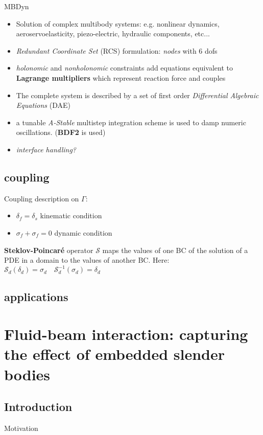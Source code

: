 \documentclass{beamer}
\begin{document}
\begin{frame}{MBDyn}
    \begin{itemize}
        \item Solution of complex multibody systems: e.g. nonlinear dynamics, aeroservoelasticity, piezo-electric, hydraulic components, etc...
        \item \textit{Redundant Coordinate Set} (RCS) formulation: \textit{nodes} with 6 dofs
        \item \textit{holonomic} and \textit{nonholonomic} constraints add equations equivalent to \textbf{Lagrange multipliers} which represent reaction force and couples
        \item The complete system is described by a set of first order \textit{Differential Algebraic Equations} (DAE)
        \item a tunable \textit{A-Stable} multistep integration scheme is used to damp numeric oscillations. (\textbf{BDF2} is used)
        \item \textit{interface handling?}
    \end{itemize}
\end{frame}

\subsection{coupling}

\begin{frame}{Coupling description}
on $\Gamma$:
    \begin{itemize}
        \item $\delta_f = \delta_s$  kinematic condition
        \item $\sigma_f + \sigma_f = 0$ dynamic condition
    \end{itemize}


\textbf{Steklov-Poincaré} operator $\mathcal{S}$ maps the values of one BC of the solution of a PDE in a domain to the values of another BC. Here: $\mathcal{S}_d(\delta_d) = \sigma_d \quad \mathcal{S}_d^{-1}(\sigma_d) = \delta_d$
\end{frame}

\subsection{applications}





\section[Fluid-beam interaction]{Fluid-beam interaction: capturing the effect of embedded slender bodies}

\subsection{Introduction}

\begin{frame}{Motivation}
    
\end{frame}
\end{document}
